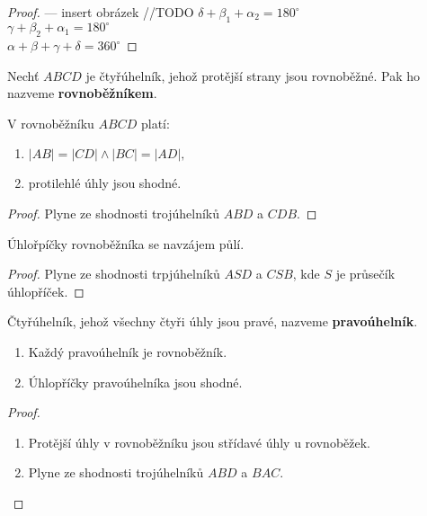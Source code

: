 \begin{proof}
  --- insert obrázek //TODO %
  $\delta+ \beta_1+ \alpha_2 = 180^\circ$\\
  $\gamma + \beta_2 + \alpha_1 = 180^\circ$\\
  $\alpha+\beta+\gamma+\delta=360^\circ$
\end{proof}

\begin{definition}
  Nechť $ABCD$ je čtyřúhelník, jehož protější strany jsou rovnoběžné. Pak ho nazveme \textbf{rovnoběžníkem}.
\end{definition}

\begin{veta}
  V rovnoběžníku $ABCD$ platí:
  \begin{enumerate}[$i.$]
    \item $|AB|=|CD| \land |BC|=|AD|,$
    \item protilehlé úhly jsou shodné.
  \end{enumerate}
\end{veta}

\begin{proof}
  Plyne ze shodnosti trojúhelníků $ABD$ a $CDB.$
\end{proof}

\begin{veta}
  Úhlořpíčky rovnoběžníka se navzájem půlí.
\end{veta}


\begin{proof}
  Plyne ze shodnosti trpjúhelníků $ASD$ a $CSB$, kde $S$ je průsečík úhlopříček.
\end{proof}

\begin{definition}
  Čtyřúhelník, jehož všechny čtyři úhly jsou pravé, nazveme \textbf{pravoúhelník}.
\end{definition}

\begin{veta}
  \begin{enumerate}[$i.$]
    \item Každý pravoúhelník je rovnoběžník.
    \item Úhlopříčky pravoúhelníka jsou shodné.
  \end{enumerate}
\end{veta}

\begin{proof}
  \begin{enumerate}[$i.$]
    \item Protější úhly v rovnoběžníku jsou střídavé úhly u rovnoběžek.
    \item Plyne ze shodnosti trojúhelníků $ABD$ a $BAC$.\qedhere
  \end{enumerate}
\end{proof}

